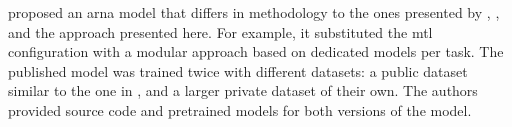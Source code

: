 
\textcite{mcleod2021modular} proposed an \gls{arna} model
that differs in methodology to the ones presented by
\textcite{chen2021attend}, \textcite{micchi2021deep}, and
the approach presented here. For example, it substituted the
\gls{mtl} configuration with a modular approach based on
dedicated models per task. The published model was trained
twice with different datasets: a public dataset similar to
the one in \textcite{micchi2021deep}, and a larger private
dataset of their own. The authors provided source code and
pretrained models for both versions of the model.
